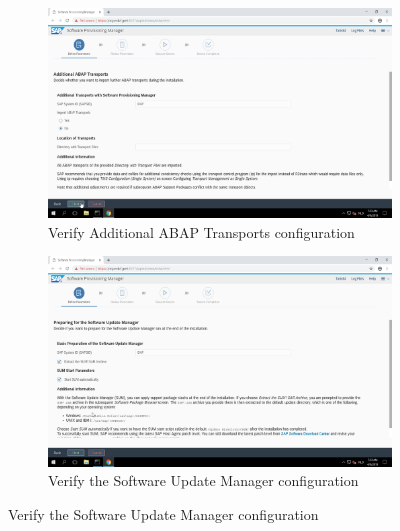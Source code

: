 \begin{figure}[!htb]\ContinuedFloat
    \begin{subfigure}{0.5\textwidth}
        \captionsetup{width=0.8\linewidth}
        \includegraphics[width=0.9\linewidth]{img/Methodologie/SAP06.png}
        \centering
        \caption{Verify Additional ABAP Transports configuration}
    \end{subfigure}
    \begin{subfigure}{0.5\textwidth}
        \captionsetup{width=0.8\linewidth}
        \includegraphics[width=0.9\linewidth]{img/Methodologie/SAP05.png} 
        \centering
        \caption{Verify the Software Update Manager configuration}
    \end{subfigure}
\end{figure}
